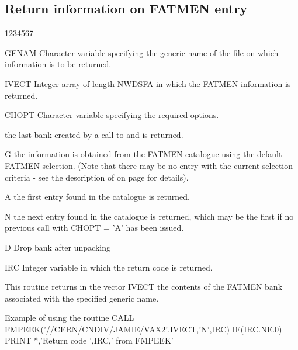 \subsection{Return information on FATMEN entry}
\begin{DLtt}{1234567}
\item[GENAM]
Character variable specifying the generic name of the file
on which information is to be returned.
\item[IVECT]
Integer array of length NWDSFA in which the FATMEN information is
returned.
\item[CHOPT]
Character variable specifying the required options.
\begin{DLtt}{12}
\item[ ]the last bank created by a call to  and 
is returned.
\item[G]the information is obtained from
the FATMEN catalogue using the default FATMEN selection.
(Note that there may be no entry with the current selection
criteria - see the description of  on page \pageref{FMGET} 
for details).
\item[A]the first entry found in the catalogue is returned.
\item[N]the next entry found in the catalogue is returned,
which may be the first if no previous call with CHOPT = 'A' has been
issued.
\item[D]Drop bank after unpacking
\end{DLtt}
\item[IRC]
Integer variable in which the return code is returned.
\end{DLtt}
\par
This routine returns in the vector IVECT the contents of the
FATMEN bank associated with the specified generic name.
\begin{XMPt}{Example of using the \protect{} routine}
CALL FMPEEK('//CERN/CNDIV/JAMIE/VAX2',IVECT,'N',IRC)
IF(IRC.NE.0) PRINT *,'Return code ',IRC,' from FMPEEK'
\end{XMPt}
 
